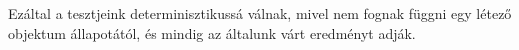 Ezáltal a tesztjeink determinisztikussá válnak, mivel nem fognak függni egy létező objektum állapotától, és mindig az általunk várt eredményt adják.
